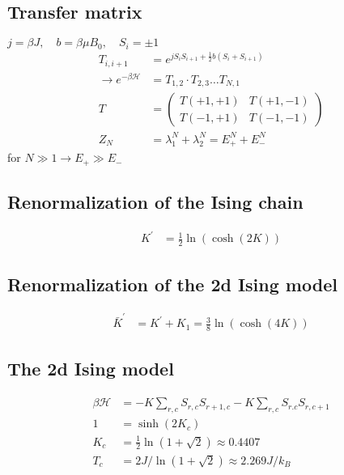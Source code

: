 \subsection*{Transfer matrix}
$j = \beta J, \quad b = \beta \mu B_0, \quad S_i = \pm 1$
\[
    \begin{aligned}
        T_{i,i+1} &= e^{jS_iS_{i+1} + \frac{1}{2}b(S_i + S_{i+1})} \\
        \rightarrow e^{-\beta \mathcal{H}} &= T_{1,2} \cdot T_{2,3} \dots T_{N,1} \\
        T &= \begin{pmatrix}
            T(+1,+1) & T(+1,-1)  \\
            T(-1,+1) & T(-1,-1)   
            \end{pmatrix}\\
        Z_N &= \lambda_1^N + \lambda_2^N = E_+^N + E_-^N 
    \end{aligned}
\]
for $N \gg 1 \rightarrow E_+ \gg E_-$

\subsection*{Renormalization of the Ising chain}
\[
    \begin{aligned}
        K^{'} &= \frac{1}{2} \ln (\cosh (2K))
    \end{aligned}
\]

\subsection*{Renormalization of the 2d Ising model}

\[
    \begin{aligned}
        \bar{K}^{'} &= K^{'} + K_1 = \frac{3}{8} \ln(\cosh(4K))
    \end{aligned}
\]

\pagebreak
\subsection*{ The 2d Ising model}
\[
    \begin{aligned}
        \beta \mathcal{H} &= -K\sum_{r,c} S_{r,c} S_{r+1,c} - K \sum_{r,c} S_{r.c} S_{r,c+1} \\
        1 &= \sinh(2K_c) \\
        K_c &= \frac{1}{2} \ln \left(1+ \sqrt{2}\right) \approx 0.4407 \\
        T_c &= 2J / \ln \left(1 + \sqrt{2}\right) \approx 2.269 J/k_B
    \end{aligned}
\]

